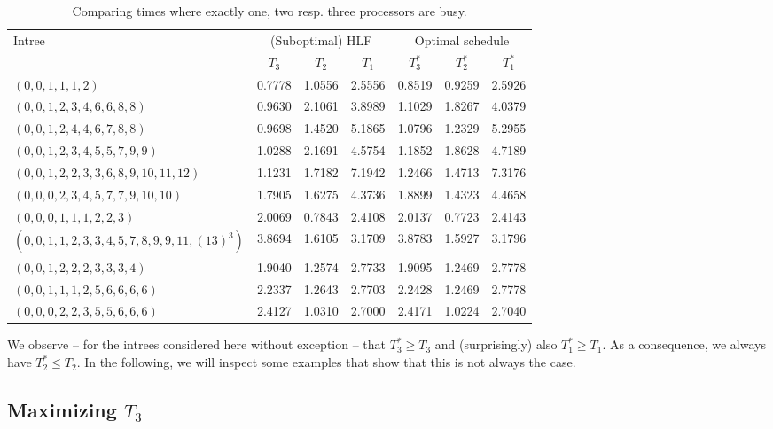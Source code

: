 \begin{table}[th]
  \centering
  \begin{tabular}[ht]{l|ccc|ccc}
    \multirow{2}{*}{Intree} & \multicolumn{3}{c|}{(Suboptimal) HLF} & \multicolumn{3}{c}{Optimal schedule} \\
    & $T_3$ & $T_2$ & $T_1$ & $T_3^*$ & $T_2^*$ & $T_1^*$ \\
    \hline
    $(0,0,1,1,1,2)$ & 0.7778 & 1.0556 & 2.5556 & 0.8519 & 0.9259 & 2.5926 \\
    $(0,0,1,2,3,4,6,6,8,8)$ & 0.9630 & 2.1061 & 3.8989 & 1.1029 & 1.8267 & 4.0379 \\
    $(0,0,1,2,4,4,6,7,8,8)$ & 0.9698 & 1.4520 & 5.1865 & 1.0796 & 1.2329 & 5.2955 \\
    $(0,0,1,2,3,4,5,5,7,9,9)$ & 1.0288 & 2.1691 & 4.5754 & 1.1852 & 1.8628 & 4.7189 \\
    $(0,0,1,2,2,3,3,6,8,9,10,11,12)$ & 1.1231 & 1.7182 & 7.1942 & 1.2466 & 1.4713 & 7.3176 \\
    $(0,0,0,2,3,4,5,7,7,9,10,10)$ & 1.7905 & 1.6275 & 4.3736 & 1.8899 & 1.4323 & 4.4658 \\
    $(0,0,0,1,1,1,2,2,3)$ & 2.0069 & 0.7843 & 2.4108 & 2.0137 & 0.7723 & 2.4143 \\ 
    $(0,0,1,1,2,3,3,4,5,7,8,9,9,11,(13)^3)$ 
      & 3.8694 & 1.6105 & 3.1709 & 3.8783 & 1.5927 & 3.1796 \\
    $(0, 0, 1, 2, 2, 2, 3, 3, 3, 4)$ & 1.9040 & 1.2574 & 2.7733 & 1.9095 & 1.2469 & 2.7778 \\
    $(0, 0, 1, 1, 1, 2, 5, 6, 6, 6, 6)$ & 2.2337 & 1.2643 & 2.7703 & 2.2428 & 1.2469 & 2.7778 \\
    $(0,0,0,2,2,3,5,5,6,6,6)$ & 2.4127 & 1.0310 & 2.7000 & 2.4171 & 1.0224 & 2.7040
  \end{tabular}
  \caption{Comparing times where exactly one, two resp. three processors are busy.}
  \label{tab:comparing-t1-t2-t3-selected-intrees}
\end{table}

We observe -- for the intrees considered here without exception -- that $T_3^* \geq T_3$ and (surprisingly) also $T_1^* \geq T_1$. As a consequence, we always have $T_2^* \leq T_2$. In the following, we will inspect some examples that show that this is not always the case.

\subsection{Maximizing $T_3$}
\label{sec:p3-disproving-long-p3}

